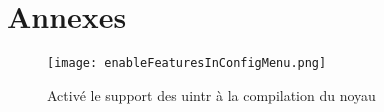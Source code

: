 \newpage

\section{Annexes}

\begin{figure}[H]
  \texttt{[image: enableFeaturesInConfigMenu.png]}
  \caption{Activé le support des uintr à la compilation du noyau}
  \label{fig:enableFeaturesInConfigMenu}
\end{figure}